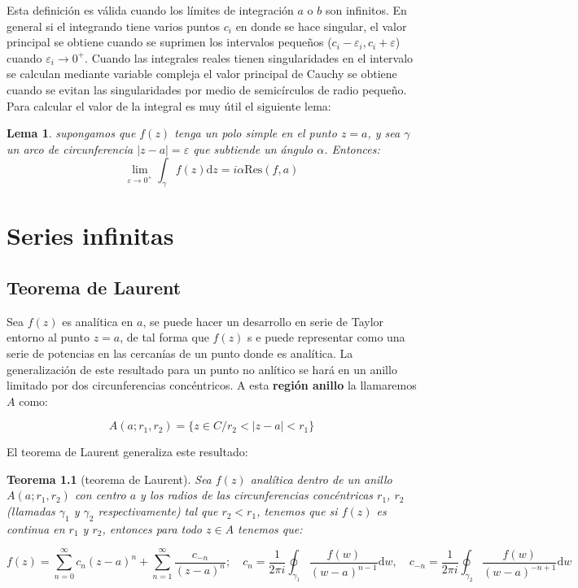 \documentclass[12pt]{book}
\newcommand{\D}{\mathrm{d}}
\newcommand{\Res}{\mathrm{Res}}
\newtheorem{theorem}{Teorema}[section]
\newtheorem{lemma}{Lema}[section]
\begin{document}
Esta definición es válida cuando los límites de integración $a$ o $b$ son infinitos. En general si el integrando tiene varios puntos $c_i$ en donde se hace singular, el valor principal se obtiene cuando se suprimen los intervalos pequeños ($ c_i - \varepsilon_i, c_i + \varepsilon $) cuando $\varepsilon_i \rightarrow 0^+$. Cuando las integrales reales tienen singularidades en el intervalo se calculan mediante variable compleja el valor principal de Cauchy se obtiene cuando se evitan las singularidades por medio de semicírculos de radio pequeño.  Para calcular el valor de la integral es muy útil el siguiente lema: %

\begin{lemma}
supongamos que $f(z)$ tenga un polo simple en el punto $z=a$, y sea $\gamma$ un arco de circunferencia $|z-a|=\varepsilon$ que subtiende un ángulo $\alpha$. Entonces:
$$ \lim_{\varepsilon \rightarrow 0^+} \int_{\gamma} f(z) \D z = i \alpha \Res(f,a) $$
\end{lemma}


\newpage

\chapter{Series infinitas}

\section{Teorema de Laurent}

Sea $f(z)$ es analítica en $a$, se puede hacer un desarrollo en serie de Taylor entorno al punto $z=a$, de tal forma que $f(z)$ s e puede representar como una serie de potencias en las cercanías de un punto donde es analítica. La generalización de este resultado para un punto no anlítico se hará en un anillo limitado por dos circunferencias concéntricos. A esta \textbf{región anillo} la llamaremos $A$ como:

$$ A(a;r_1,r_2) = \{  z \in C / r_2 < |z-a| < r_1 \} $$

El teorema de Laurent generaliza este resultado:

\begin{theorem}[teorema de Laurent]
Sea $f(z)$ analítica dentro de un anillo $A(a;r_1,r_2)$ con centro $a$ y los radios de las circunferencias concéntricas $r_1$, $r_2$ (llamadas $\gamma_1$ y $\gamma_2$ respectivamente) tal que $r_2 < r_1$, tenemos que si $f(z)$ es continua en $r_1$ y $r_2$, entonces para todo $z \in A$ tenemos que: %

$$ f(z) = \sum_{n=0}^{\infty} c_n (z-a)^n + \sum_{n=1}^{\infty} \frac{c_{-n}}{(z-a)^n}; \quad c_n = \dfrac{1}{2 \pi i} \oint_{\gamma_1} \dfrac{f(w)}{(w-a)^{n-1}} \D w, \quad c_{-n} = \dfrac{1}{2 \pi i} \oint_{\gamma_2} \dfrac{f(w)}{(w-a)^{-n+1}} \D w  $$
\end{theorem}
\end{document}
